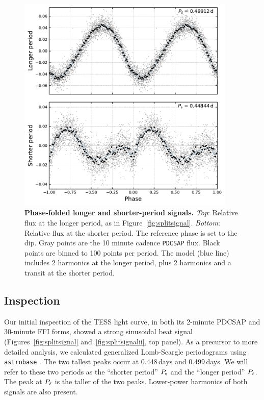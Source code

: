 \documentclass[12pt,twocolumn,tighten]{aastex62}
\begin{document}
\begin{figure}[t]
	\begin{center}
		\leavevmode
		\includegraphics[width=0.93\textwidth]{f3.pdf}
	\end{center}
	\vspace{-0.7cm}
	\caption{ {\bf Phase-folded longer and shorter-period signals.}
    {\it Top}: Relative flux at the longer period, as in
    Figure~\ref{fig:splitsignal}.  {\it Bottom}: Relative flux at the
    shorter period. The reference phase is set to the dip.  Gray
    points are the 10 minute cadence \texttt{PDCSAP} flux.  Black
    points are binned to 100 points per period.
    The model (blue line)
    includes 2 harmonics at the longer period,
    plus 2 harmonics and a transit at the shorter period.
		\label{fig:phasefold}
	}
\end{figure}

\subsection{Inspection}

Our initial inspection of the TESS light curve, in both its 2-minute
PDCSAP and 30-minute FFI forms, showed a strong sinusoidal beat signal
(Figures~\ref{fig:splitsignal} and~\ref{fig:splitsignalii}, top
panel). As a precursor to more detailed analysis, we calculated
generalized Lomb-Scargle periodograms using \texttt{astrobase}
\citep{lomb_1976,scargle_studies_1982,vanderplas_periodograms_2015,bhatti_astrobase_2018}.
The two tallest peaks occur at 0.448\,days and 0.499\,days.  We will
refer to these two periods as the ``shorter period'' $P_{\rm s}$ and
the ``longer period'' $P_{\rm \ell}$.  The peak at $P_{\rm \ell}$ is
the taller of the two peaks.  Lower-power harmonics of both signals
are also present.
\end{document}
